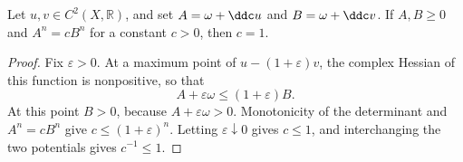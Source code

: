 \begin{proposition}\label{prop:classical-scalar-uniqueness}
Let $u,v\in C^2(X,\mathbb R)$, and set $A=\omega+\ddc u$ and $B=\omega+\ddc v$.
If $A,B\geq0$ and $A^n=cB^n$ for a constant $c>0$, then $c=1$.
\end{proposition}

\begin{proof}
Fix $\varepsilon>0$. At a maximum point of $u-(1+\varepsilon)v$, the complex Hessian of this function is nonpositive, so that
\[
 A+\varepsilon\omega\leq(1+\varepsilon)B.
\]
At this point $B>0$, because $A+\varepsilon\omega>0$. Monotonicity of the determinant and $A^n=cB^n$ give $c\leq(1+\varepsilon)^n$. Letting $\varepsilon\downarrow0$ gives $c\leq1$, and interchanging the two potentials gives $c^{-1}\leq1$.
\end{proof}
